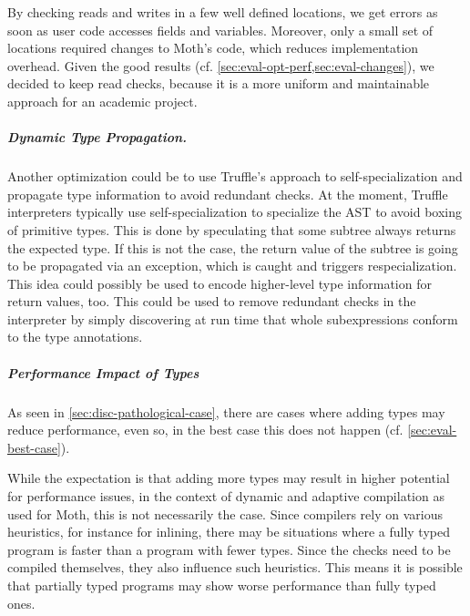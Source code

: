 By checking reads and writes in a few well defined locations,
we get errors as soon as user code accesses fields and variables.
Moreover, only a small set of locations required changes to Moth's code,
which reduces implementation overhead.
Given the good
results (cf. \cref{sec:eval-opt-perf,sec:eval-changes}), we decided to keep read checks, because it is a more uniform and maintainable
approach for an academic project.


\subparagraph{Dynamic Type Propagation.}
Another optimization could be to use Truffle's approach to 
self-specialization\citep{Wurthinger:2012:SelfOptAST}
and propagate type information to avoid redundant checks.
At the moment, Truffle interpreters typically use self-specialization to 
specialize the AST to avoid boxing of primitive types.
This is done by speculating that some subtree always returns the expected type.
If this is not the case, the return value of the subtree is going to be
propagated via an exception, which is caught and triggers respecialization.
This idea could possibly be used to encode higher-level type information for
return values, too.
This could be used to remove redundant checks in the interpreter
by simply discovering at run time that whole subexpressions conform to the
type annotations.

\subparagraph{Performance Impact of Types}

As seen in \cref{sec:disc-pathological-case},
there are cases where adding types may reduce performance,
even so, in the best case this does not happen (cf. \cref{sec:eval-best-case}).

While the expectation is that adding more types may result in higher potential
for performance issues, in the context of dynamic and adaptive compilation
as used for Moth, this is not necessarily the case.
Since compilers rely on various heuristics, for instance for inlining,
there may be situations where a fully typed program is faster than
a program with fewer types.
Since the checks need to be compiled themselves, they also influence such heuristics.
This means it is possible that
partially typed programs may show worse performance than fully typed ones.

